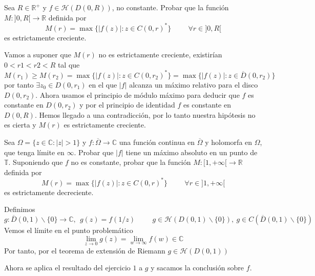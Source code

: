 \begin{ejer}
	Sea $R\in\mathbb{R}^+$ y $f\in\mathcal{H}(D(0,R))$, no constante.
	Probar que la función $M : ]0,R[\rightarrow\mathbb{R}$ definida por
	$$ M(r) = \max\{ |f(z)| : z\in C(0,r)^{\ast} \} \hspace{1cm} \forall r\in ]0,R[ $$
	es estrictamente creciente.
\end{ejer}

\begin{sol}
Vamos a suponer que $M(r)$ no es estrictamente creciente, existirían $0<r1<r2<R$ tal que
$$M(r_1) \geq M(r_2) = \max\{ |f(z)| : z\in C(0,r_2)^{\ast} \} = \max\{ |f(z)| : z\in\overline{D}(0,r_2) \}$$
por tanto
$\exists z_0 \in D(0,r_1)$ en el que $|f|$ alcanza un máximo relativo para el disco $D(0,r_2)$.
Ahora usamos el principio de módulo máximo para deducir que 
$f$ es constante en $D(0,r_2)$ y por el principio de identidad
$f$ es constante en $D(0,R)$. 
Hemos llegado a una contradicción, por lo tanto nuestra hipótesis no es cierta y $M(r)$ es estrictamente creciente.

\end{sol}

\begin{ejer}
	Sea $\Omega = \{ z\in\mathbb{C} : |z|>1 \}$ y $f:\overline{\Omega}\rightarrow\mathbb{C}$ una función continua en $\overline{\Omega}$ y holomorfa en $\Omega$, que tenga límite en $\infty$. 
	Probar que $|f|$ tiene un máximo absoluto en un punto de $\mathbb{T}$.
	Suponiendo que $f$ no es constante, probar que la función $M:[1,+\infty[\rightarrow\mathbb{R}$ definida por
	$$ M(r) = \max\{ |f(z)| : z\in C(0,r)^{\ast} \}  \hspace{1cm} \forall r\in ]1,+\infty[$$
	es estrictamente decreciente.
\end{ejer}
\begin{sol}
Definimos
$$g:\overline{D}(0,1)\backslash\{0\} \rightarrow \mathbb{C}, \ \ g(z) = f(1/z) \hspace{1cm} g\in\mathcal{H}(D(0,1)\backslash\{0\}), \
g\in C(\overline{D}(0,1)\backslash\{0\})$$
Vemos el límite en el punto problemático
$$\lim_{z\rightarrow0} g(z) = \lim_{w\rightarrow\infty} f(w) \in\mathbb{C}$$
Por tanto, por el teorema de extensión de Riemann
$g\in\mathcal{H}(D(0,1))$

Ahora se aplica el resultado del ejercicio $1$ a $g$ y sacamos la conclusión sobre $f$.
\end{sol}


